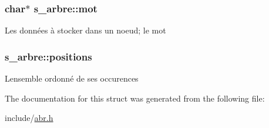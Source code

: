 \subsubsection[{\texorpdfstring{mot}{mot}}]{\setlength{\rightskip}{0pt plus 5cm}char$\ast$ s\+\_\+arbre\+::mot}\hypertarget{structs__arbre_a7853fb86d241c6569f3449e6589f3c8a}{}\label{structs__arbre_a7853fb86d241c6569f3449e6589f3c8a}
Les données à stocker dans un noeud; le mot 
\subsubsection[{\texorpdfstring{positions}{positions}}]{ s\+\_\+arbre\+::positions}\hypertarget{structs__arbre_af3754e685aace8398941e5a09190201c}{}\label{structs__arbre_af3754e685aace8398941e5a09190201c}
L\textquotesingle{}ensemble ordonné de ses occurences 

The documentation for this struct was generated from the following file\+:\begin{DoxyCompactItemize}
\item 
include/\hyperlink{abr_8h}{abr.\+h}\end{DoxyCompactItemize}
